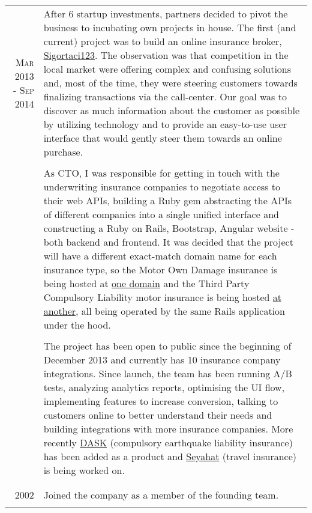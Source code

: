 \documentclass[a4paper,10pt]{article}
\newcommand{\exptitle}[2]{
  \multicolumn{2}{l}{\textsc{#1} \footnotesize{#2}} \\
  \specialrule{.01em}{0.5em}{1em}
}
\begin{document}
\begin{longtable}{r|p{11cm}}
  \textsc{Mar 2013 - Sep 2014}   & After 6 startup investments, partners decided to pivot the business to incubating own projects in house. The first (and current) project was to build an online insurance broker, \href{https://sigortaci123.com}{Sigortaci123}. The observation was that competition in the local market were offering complex and confusing solutions and, most of the time, they were steering customers towards finalizing transactions via the call-center. Our goal was to discover as much information about the customer as possible by utilizing technology and to provide an easy-to-use user interface that would gently steer them towards an online purchase. \\
                                & \\
                                & As CTO, I was responsible for getting in touch with the underwriting insurance companies to negotiate access to their web APIs, building a Ruby gem abstracting the APIs of different companies into a single unified interface and constructing a Ruby on Rails, Bootstrap, Angular website - both backend and frontend. It was decided that the project will have a different exact-match domain name for each insurance type, so the Motor Own Damage insurance is being hosted at \href{https://kasko123.com}{one domain} and the Third Party Compulsory Liability motor insurance is being hosted \href{https://trafik123.com}{at another}, all being operated by the same Rails application under the hood. \\
                                & \\
                                & The project has been open to public since the beginning of December 2013 and currently has 10 insurance company integrations. Since launch, the team has been running A/B tests, analyzing analytics reports, optimising the UI flow, implementing features to increase conversion, talking to customers online to better understand their needs and building integrations with more insurance companies. More recently \href{https://dask123.com}{DASK} (compulsory earthquake liability insurance) has been added as a product and \href{https://seyahat123.com}{Seyahat} (travel insurance) is being worked on. \\
  \multicolumn{2}{c}{} \\

  \newpage

  \exptitle{PhonoClick}{Jan 2002 – Aug 2011}

  \textsc{2002}                 & Joined the company as a member of the founding team. \\
  \multicolumn{2}{c}{} \\


\end{longtable}
\end{document}
